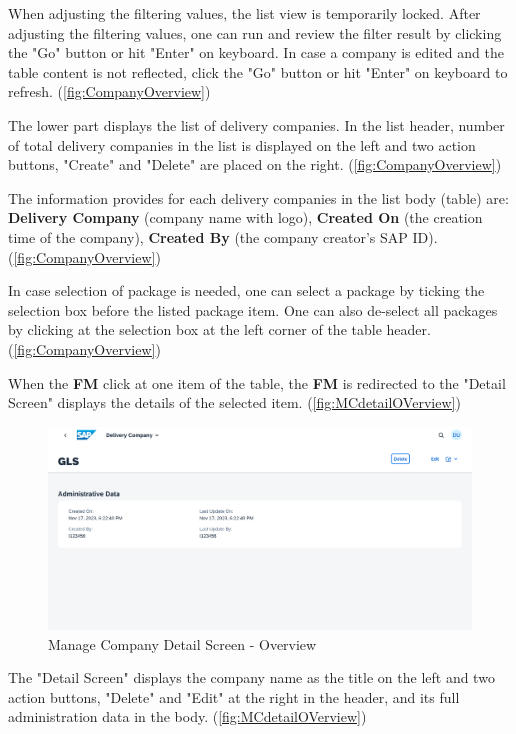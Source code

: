 When adjusting the filtering values, the list view is temporarily locked. After adjusting the filtering values, one can run and review the filter result by clicking the "Go" button or hit "Enter" on keyboard. In case a company is edited and the table content is not reflected, click the "Go" button or hit "Enter" on keyboard to refresh. (\autoref{fig:CompanyOverview})

The lower part displays the list of delivery companies. In the list header, number of total delivery companies in the list is displayed on the left and two action buttons, "Create" and "Delete" are placed on the right. (\autoref{fig:CompanyOverview})

The information provides for each delivery companies in the list body (table) are: \textbf{Delivery Company} (company name with logo), \textbf{Created On} (the creation time of the company), \textbf{Created By} (the company creator's SAP ID). (\autoref{fig:CompanyOverview})

In case selection of package is needed, one can select a package by ticking the selection box before the listed package item. One can also de-select all packages by clicking at the selection box at the left corner of the table header. (\autoref{fig:CompanyOverview})

\bigskip

When the \textbf{FM} click at one item of the table, the \textbf{FM} is redirected to the "Detail Screen" displays the details of the selected item. (\autoref{fig:MCdetailOVerview})

\begin{figure}[H]
	\centering
	\includegraphics[width=1\linewidth]{images/user_doc/company/detail/DetailOverview.png}
	\caption{Manage Company Detail Screen - Overview}
	\label{fig:MCdetailOVerview}
\end{figure}

The "Detail Screen" displays the company name as the title on the left and two action buttons, "Delete" and "Edit" at the right in the header, and its full administration data in the body. (\autoref{fig:MCdetailOVerview})


